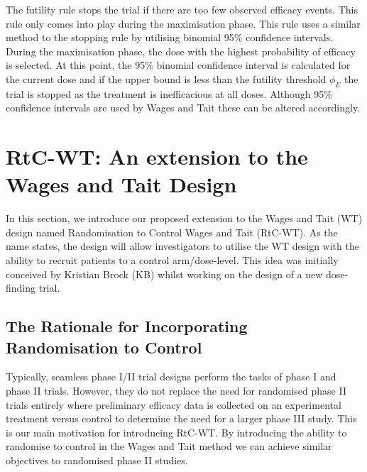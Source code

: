 The futility rule stops the trial if there are too few observed efficacy events. This rule only comes into play during the maximisation phase. This rule uses a similar method to the stopping rule by utilising binomial 95\% confidence intervals. During the maximisation phase, the dose with the highest probability of efficacy is selected. At this point, the 95\% binomial confidence interval is calculated for the current dose and if the upper bound is less than the futility threshold $\phi_E$ the trial is stopped as the treatment is inefficacious at all doses. Although 95\% confidence intervals are used by Wages and Tait these can be altered accordingly. 


\section{RtC-WT: An extension to the Wages and Tait Design}
\label{WT:RtC-WT}
 
In this section, we introduce our proposed extension to the Wages and Tait (WT) design named Randomisation to Control Wages and Tait (RtC-WT). As the name states, the design will allow investigators to utilise the WT design with the ability to recruit patients to a control arm/dose-level. This idea was initially conceived by Kristian Brock (KB) whilst working on the design of a new dose-finding trial.  

\subsection{The Rationale for Incorporating Randomisation to Control}
\label{WT:Rationale-for-RtC-WT}
 
Typically, seamless phase \RN{1}/\RN{2} trial designs perform the tasks of phase \RN{1} and phase \RN{2} trials. However, they do not replace the need for randomised phase \RN{2} trials entirely where preliminary efficacy data is collected on an experimental treatment versus control to determine the need for a larger phase \RN{3} study. This is our main motivation for introducing RtC-WT. By introducing the ability to randomise to control in the Wages and Tait method we can achieve similar objectives to randomised phase \RN{2} studies. 
 
